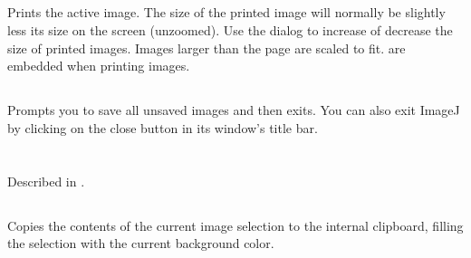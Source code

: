 \subsection{\protect{}\label{sub:Print...[p]}}

Prints the active image. The size of the printed image
will normally be slightly less its size on the screen (unzoomed).
Use the  dialog to increase
of decrease the size of printed images. Images larger than the page
are scaled to fit.  are embedded when
printing images. 


\subsection{\protect{}}

Prompts you to save all unsaved images and then exits. You can also
exit ImageJ by clicking on the close button in its window's
title bar.

\clearpage{}


\section{\protect{}\label{sec:Edit}}


\subsection{\protect{}\label{sub:Undo-[z]}}

Described in {\small {}.}{\small \par}


\subsection{\protect{}\label{sub:Cut[x]}}

Copies the contents of the current image selection to the internal
clipboard, filling the selection with the current background color.




\subsection{\protect{}\label{sub:Copy[c]}}


